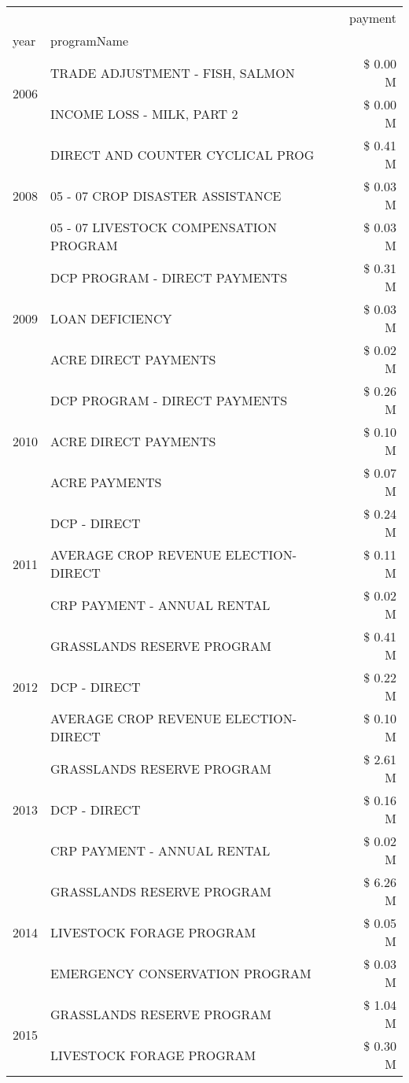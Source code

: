\begin{tabular}{llr}
\toprule
 &  & payment \\
year & programName &  \\
\midrule
\multirow[t]{2}{*}{2006} & TRADE ADJUSTMENT - FISH, SALMON & \$ 0.00 M \\
 & INCOME LOSS - MILK, PART 2 & \$ 0.00 M \\
\cline{1-3}
\multirow[t]{3}{*}{2008} & DIRECT AND COUNTER CYCLICAL PROG & \$ 0.41 M \\
 & 05 - 07 CROP DISASTER ASSISTANCE & \$ 0.03 M \\
 & 05 - 07 LIVESTOCK COMPENSATION PROGRAM & \$ 0.03 M \\
\cline{1-3}
\multirow[t]{3}{*}{2009} & DCP PROGRAM - DIRECT PAYMENTS & \$ 0.31 M \\
 & LOAN DEFICIENCY & \$ 0.03 M \\
 & ACRE DIRECT PAYMENTS & \$ 0.02 M \\
\cline{1-3}
\multirow[t]{3}{*}{2010} & DCP PROGRAM - DIRECT PAYMENTS & \$ 0.26 M \\
 & ACRE DIRECT PAYMENTS & \$ 0.10 M \\
 & ACRE PAYMENTS & \$ 0.07 M \\
\cline{1-3}
\multirow[t]{3}{*}{2011} & DCP - DIRECT & \$ 0.24 M \\
 & AVERAGE CROP REVENUE ELECTION-DIRECT & \$ 0.11 M \\
 & CRP PAYMENT - ANNUAL RENTAL & \$ 0.02 M \\
\cline{1-3}
\multirow[t]{3}{*}{2012} & GRASSLANDS RESERVE PROGRAM & \$ 0.41 M \\
 & DCP - DIRECT & \$ 0.22 M \\
 & AVERAGE CROP REVENUE ELECTION-DIRECT & \$ 0.10 M \\
\cline{1-3}
\multirow[t]{3}{*}{2013} & GRASSLANDS RESERVE PROGRAM & \$ 2.61 M \\
 & DCP - DIRECT & \$ 0.16 M \\
 & CRP PAYMENT - ANNUAL RENTAL & \$ 0.02 M \\
\cline{1-3}
\multirow[t]{3}{*}{2014} & GRASSLANDS RESERVE PROGRAM & \$ 6.26 M \\
 & LIVESTOCK FORAGE PROGRAM & \$ 0.05 M \\
 & EMERGENCY CONSERVATION PROGRAM & \$ 0.03 M \\
\cline{1-3}
\multirow[t]{3}{*}{2015} & GRASSLANDS RESERVE PROGRAM & \$ 1.04 M \\
 & LIVESTOCK FORAGE PROGRAM & \$ 0.30 M \\

\end{tabular}
